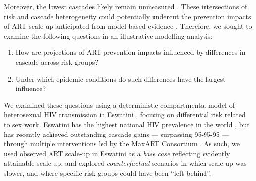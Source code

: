 Moreover, the lowest cascades likely remain unmeasured \cite{Hakim2018,Boothe2021}.
These intersections of risk and cascade heterogeneity
could potentially undercut the prevention impacts of ART scale-up
anticipated from model-based evidence \cite{Baral2019}.
Therefore, we sought to examine the following questions
in an illustrative modelling analysis:
\begin{enumerate}
  \item\label{obj:1} How are projections of ART prevention impacts
    influenced by differences in cascade across risk groups?
  \item\label{obj:2} Under which epidemic conditions
    do such differences have the largest influence?
\end{enumerate}
We examined these questions using
a deterministic compartmental model of heterosexual HIV transmission in Eswatini \cite{Knight2019},
focusing on differential risk related to sex work.
Eswatini has the highest national HIV prevalence in the world \cite{UNAIDS2021},
but has recently achieved outstanding cascade gains --- surpassing 95-95-95 ---
through multiple interventions led by the MaxART Consortium \cite{Walsh2020,SHIMS3,AIDSinfo}.
As such, we used observed ART scale-up in Eswatini as a \emph{base case}
reflecting evidently attainable scale-up,
and explored \emph{counterfactual} scenarios in which scale-up was slower,
and where specific risk groups could have been ``left behind''.
